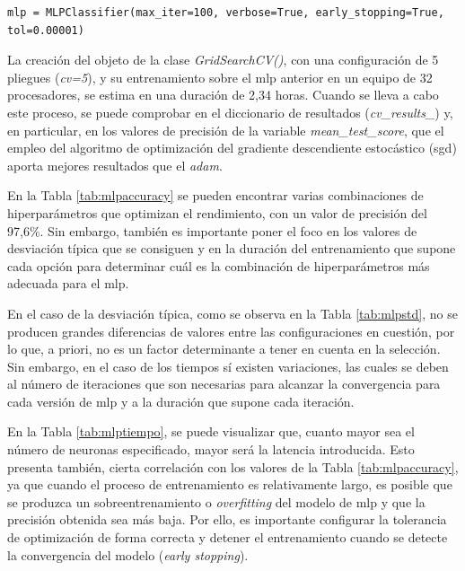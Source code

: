 \vspace{3mm}

\begin{lstlisting}[style=Python, caption={Clasificador MLP por defecto}]
  mlp = MLPClassifier(max_iter=100, verbose=True, early_stopping=True, tol=0.00001)
\end{lstlisting}

\vspace{3mm}

La creación del objeto de la clase \textit{GridSearchCV()}, con una configuración de 5 pliegues (\textit{cv=5}), y su entrenamiento sobre el \gls{mlp} anterior en un equipo de 32 procesadores, se estima en una duración de 2,34 horas. Cuando se lleva a cabo este proceso, se puede comprobar en el diccionario de resultados (\textit{cv\_results\_}) y, en particular, en los valores de precisión de la variable \textit{mean\_test\_score}, que el empleo del algoritmo de optimización del gradiente descendiente estocástico (\gls{sgd}) aporta mejores resultados que el \textit{adam}. 

\vspace{3mm}

En la Tabla \ref{tab:mlpaccuracy} se pueden encontrar varias combinaciones de hiperparámetros que optimizan el rendimiento, con un valor de precisión del 97,6\%. Sin embargo, también es importante poner el foco en los valores de desviación típica que se consiguen y en la duración del entrenamiento que supone cada opción para determinar cuál es la combinación de hiperparámetros más adecuada para el \gls{mlp}. 

\pagebreak

En el caso de la desviación típica, como se observa en la Tabla \ref{tab:mlpstd}, no se producen grandes diferencias de valores entre las configuraciones en cuestión, por lo que, a priori, no es un factor determinante a tener en cuenta en la selección. Sin embargo, en el caso de los tiempos sí existen variaciones, las cuales se deben al número de iteraciones que son necesarias para alcanzar la convergencia para cada versión de \gls{mlp} y a la duración que supone cada iteración. 

\vspace{3mm}

En la Tabla \ref{tab:mlptiempo}, se puede visualizar que, cuanto mayor sea el número de neuronas especificado, mayor será la latencia introducida. Esto presenta también, cierta correlación con los valores de la Tabla \ref{tab:mlpaccuracy}, ya que cuando el proceso de entrenamiento es relativamente largo, es posible que se produzca un sobreentrenamiento o \textit{overfitting} del modelo de \gls{mlp} y que la precisión obtenida sea más baja. Por ello, es importante configurar la tolerancia de optimización de forma correcta y detener el entrenamiento cuando se detecte la convergencia del modelo (\textit{early stopping}).

